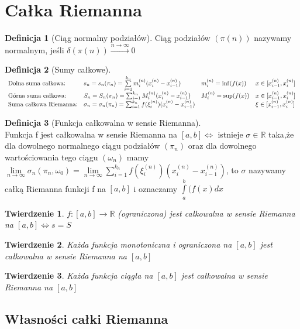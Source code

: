 \documentclass[12pt,a4paper]{article}
\newtheorem{tw}{Twierdzenie}
\theoremstyle{definition}
\newtheorem{df}{Definicja}
\begin{document}
\section{Całka Riemanna}
\begin{df}[Ciąg normalny podziałów]
Ciąg podziałów $(\pi(n))$ nazywamy normalnym, jeśli $\delta (\pi (n)) \xrightarrow{n\to\infty}0$
\end{df}
\begin{df}[Sumy całkowe]~\\
$\begin{array}{l l l l}
\text{Dolna suma całkowa:}& s_n = s_n(\pi_n) = \sum \limits_{i=1}^{k_n}m_i^{(n)}
(x_i^{(n)}-x_{i-1}^{(n)}) & m_i^{(n)} =
 \inf (f(x)) & x\in [x_{i-1}^{(n)} ,x_{i}^{(n)} ]\\
\text{Górna suma całkowa:}& S_n = S_n(\pi_n) = \sum_{i=1}^{k_n}M_i^{(n)}(x_i^{(n)}-x_{i-1}^{(n)}) & M_i^{(n)} = \sup (f(x)) & x\in [x_{i-1}^{(n)},x_{i}^{(n)}]\\
\text{Suma całkowa Riemanna:}& \sigma_n = \sigma_n(\pi_n) = \sum_{i=1}^{k_n}f(\xi_i^{(n)})(x_i^{(n)}-x_{i-1}^{(n)}) & & \xi\in [x_{i-1}^{(n)},x_{i}^{(n)}]
\end{array}$
\end{df}
\begin{df}[Funkcja całkowalna w sensie Riemanna]~\\
Funkcja f jest całkowalna w sensie Riemanna na $[a,b] \Leftrightarrow$ istnieje $\sigma\in\mathbb{R}$ taka,że dla dowolnego normalnego ciągu podziałów $(\pi_n)$ oraz dla dowolnego wartościowania tego ciągu $(\omega_n)$ mamy $\lim\limits_{n\to\infty}\sigma_n(\pi_n,\omega_0) = \lim\limits_{n\to\infty}\sum\limits_{i=1}^{k_n}f(\xi_i^{(n)})(x_i^{(n)}-x_{i-1}^{(n)})$, to $\sigma$ nazywamy całką Riemanna funkcji f na $[a,b]$ i oznaczamy $\int\limits_a^b(f(x)dx$
\end{df}
\begin{tw}
$f: [a,b] \rightarrow \mathbb{R}$ (ograniczona) jest całkowalna w sensie Riemanna na $[a,b] \Leftrightarrow s=S$
\end{tw}
\begin{tw}
Każda funkcja monotoniczna i ograniczona na $[a,b]$ jest całkowalna w sensie Riemanna na $[a,b]$
\end{tw}
\begin{tw}
Każda funkcja ciągła na $[a,b]$ jest całkowalna w sensie Riemanna na $[a,b]$
\end{tw}

\subsection{Własności całki Riemanna}
\end{document}
